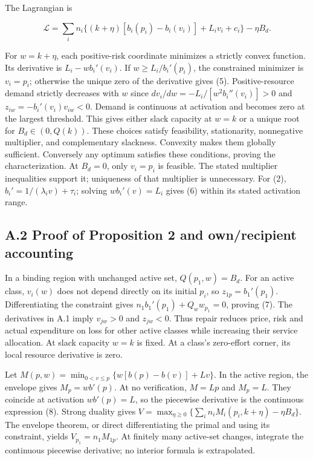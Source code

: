 \documentclass[
  11pt,
  a4paper,
]{article}
\begin{document}
The Lagrangian is

\[\mathcal L=\sum_i n_i\{(k+\eta)[b_i(p_i)-b_i(v_i)]+L_i v_i+c_i\}-\eta B_d.\]

For \(w=k+\eta\), each positive-risk coordinate minimizes a strictly
convex function. Its derivative is \(L_i-wb_i'(v_i)\). If
\(w\geq L_i/b_i'(p_i)\), the constrained minimizer is \(v_i=p_i\);
otherwise the unique zero of the derivative gives (5). Positive-resource
demand strictly decreases with \(w\) since
\(dv_i/dw=-L_i/[w^2 b_i''(v_i)]>0\) and \(z_{iw}=-b_i'(v_i)v_{iw}<0\).
Demand is continuous at activation and becomes zero at the largest
threshold. This gives either slack capacity at \(w=k\) or a unique root
for \(B_d\in(0,Q(k))\). These choices satisfy feasibility, stationarity,
nonnegative multiplier, and complementary slackness. Convexity makes
them globally sufficient. Conversely any optimum satisfies these
conditions, proving the characterization. At \(B_d=0\), only \(v_i=p_i\)
is feasible. The stated multiplier inequalities support it; uniqueness
of that multiplier is unnecessary. For (2),
\(b_i'=1/(\lambda_i v)+\tau_i\); solving \(wb_i'(v)=L_i\) gives (6)
within its stated activation range.

\hypertarget{a.2-proof-of-proposition-2-and-ownrecipient-accounting}{%
\subsection{A.2 Proof of Proposition 2 and own/recipient
accounting}\label{a.2-proof-of-proposition-2-and-ownrecipient-accounting}}

In a binding region with unchanged active set, \(Q(p_1,w)=B_d\). For an
active class, \(v_i(w)\) does not depend directly on its initial
\(p_i\), so \(z_{1p}=b_1'(p_1)\). Differentiating the constraint gives
\(n_1b_1'(p_1)+Q_w w_{p_1}=0\), proving (7). The derivatives in A.1
imply \(v_{jw}>0\) and \(z_{jw}<0\). Thus repair reduces price, risk and
actual expenditure on loss for other active classes while increasing
their service allocation. At slack capacity \(w=k\) is fixed. At a
class's zero-effort corner, its local resource derivative is zero.

Let \(M(p,w)=\min_{0<v\leq p}\{w[b(p)-b(v)]+Lv\}\). In the active
region, the envelope gives \(M_p=wb'(p)\). At no verification, \(M=Lp\)
and \(M_p=L\). They coincide at activation \(w b'(p)=L\), so the
piecewise derivative is the continuous expression (8). Strong duality
gives \(V=\max_{\eta\geq0}\{\sum_i n_iM_i(p_i,k+\eta)-\eta B_d\}\). The
envelope theorem, or direct differentiating the primal and using its
constraint, yields \(V_{p_1}=n_1M_{1p}\). At finitely many active-set
changes, integrate the continuous piecewise derivative; no interior
formula is extrapolated.
\end{document}
